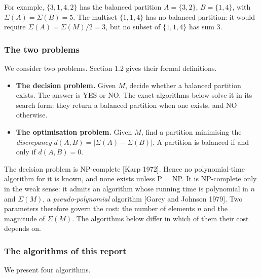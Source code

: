 \documentclass[
]{article}
\providecommand{\tightlist}{%
  \setlength{\itemsep}{0pt}\setlength{\parskip}{0pt}}
\begin{document}
For example, \(\{3, 1, 4, 2\}\) has the balanced partition
\(A = \{3, 2\}\), \(B = \{1, 4\}\), with \(\Sigma(A) = \Sigma(B) = 5\).
The multiset \(\{1, 1, 4\}\) has no balanced partition: it would require
\(\Sigma(A) = \Sigma(M)/2 = 3\), but no subset of \(\{1, 1, 4\}\) has
sum \(3\).

\hypertarget{the-two-problems}{%
\subsubsection{The two problems}\label{the-two-problems}}

We consider two problems. Section 1.2 gives their formal definitions.

\begin{itemize}
\tightlist
\item
  \textbf{The decision problem.} Given \(M\), decide whether a balanced
  partition exists. The answer is YES or NO. The exact algorithms below
  solve it in its search form: they return a balanced partition when one
  exists, and NO otherwise.
\item
  \textbf{The optimisation problem.} Given \(M\), find a partition
  minimising the \emph{discrepancy}
  \(d(A, B) = |\Sigma(A) - \Sigma(B)|\). A partition is balanced if and
  only if \(d(A, B) = 0\).
\end{itemize}

The decision problem is NP-complete {[}Karp 1972{]}. Hence no
polynomial-time algorithm for it is known, and none exists unless P =
NP. It is NP-complete only in the weak sense: it admits an algorithm
whose running time is polynomial in \(n\) and \(\Sigma(M)\), a
\emph{pseudo-polynomial} algorithm {[}Garey and Johnson 1979{]}. Two
parameters therefore govern the cost: the number of elements \(n\) and
the magnitude of \(\Sigma(M)\). The algorithms below differ in which of
them their cost depends on.

\hypertarget{the-algorithms-of-this-report}{%
\subsubsection{The algorithms of this
report}\label{the-algorithms-of-this-report}}

We present four algorithms.
\end{document}

